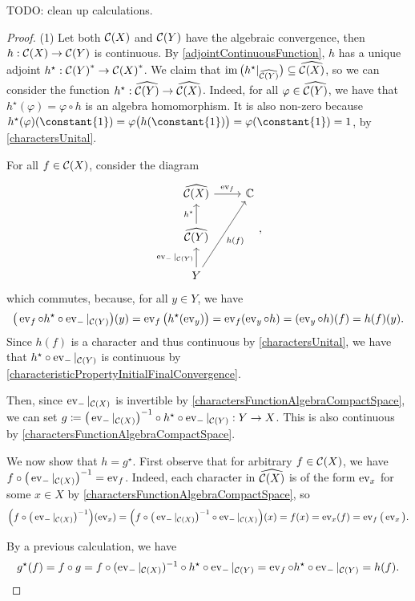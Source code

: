 TODO: clean up calculations.
\begin{proof}
(1) Let both $\operatorname{\mathcal{C}}(X)$ and $\operatorname{\mathcal{C}}(Y)$ have the algebraic convergence, then $h: \operatorname{\mathcal{C}}(X)\to \operatorname{\mathcal{C}}(Y)$ is continuous. By  \ref{adjointContinuousFunction}, $h$ has a unique adjoint $h^\star: {\operatorname{\mathcal{C}}(Y)}^* \to {\operatorname{\mathcal{C}}(X)}^*$. We claim that $\operatorname{im}\big(h^\star|_{\widehat{\operatorname{\mathcal{C}}(Y)}}\big) \subseteq \widehat{\operatorname{\mathcal{C}}(X)}$, so we can consider the function $h^\star: \widehat{\operatorname{\mathcal{C}}(Y)}\to \widehat{\operatorname{\mathcal{C}}(X)}$. Indeed, for all $\varphi\in \widehat{\operatorname{\mathcal{C}}(Y)}$, we have that $h^\star(\varphi) = \varphi \circ h$ is an algebra homomorphism. It is also non-zero because $h^\star(\varphi)(\constant{1}) = \varphi\big(h(\constant{1})\big) = \varphi(\constant{1}) = 1$, by \ref{charactersUnital}.

For all $f\in \operatorname{\mathcal{C}}(X)$, consider the diagram
\[ \begin{tikzcd}
\widehat{\cont(X)} \ar[r, "\evalMap_f"] & \C \\
\widehat{\cont(Y)} \ar[u, "h^\star"] & {} \\
Y \ar[u, "{\evalMap_{-}|_{\cont(Y)}}"] \ar[uur, swap, "h(f)"]
\end{tikzcd}, \]
which commutes, because, for all $y\in Y$, we have
\[ \big(\operatorname{ev}_f \circ h^\star \circ \operatorname{ev}_{-}|_{\operatorname{\mathcal{C}}(Y)}\big)(y) = \operatorname{ev}_f\big(h^\star (\operatorname{ev}_y)\big) = \operatorname{ev}_f(\operatorname{ev}_y \circ h) = (\operatorname{ev}_y\circ h)(f) = h(f)(y). \]
Since $h(f)$ is a character and thus continuous by \ref{charactersUnital}, we have that $h^\star \circ \operatorname{ev}_{-}|_{\operatorname{\mathcal{C}}(Y)}$ is continuous by \ref{characteristicPropertyInitialFinalConvergence}.

Then, since $\operatorname{ev}_{-}|_{\operatorname{\mathcal{C}}(X)}$ is invertible by \ref{charactersFunctionAlgebraCompactSpace}, we can set $g \coloneqq \big(\operatorname{ev}_{-}|_{\operatorname{\mathcal{C}}(X)}\big)^{-1} \circ h^\star \circ \operatorname{ev}_{-}|_{\operatorname{\mathcal{C}}(Y)}: Y\to X$. This is also continuous by \ref{charactersFunctionAlgebraCompactSpace}.

We now show that $h = g^\star$. First observe that for arbitrary $f\in \operatorname{\mathcal{C}}(X)$, we have $f\circ \big(\operatorname{ev}_{-}|_{\operatorname{\mathcal{C}}(X)}\big)^{-1} = \operatorname{ev}_f$. Indeed, each character in $\widehat{\operatorname{\mathcal{C}}(X)}$ is of the form $\operatorname{ev}_x$ for some $x\in X$ by \ref{charactersFunctionAlgebraCompactSpace}, so
\[ \Big(f\circ \big(\operatorname{ev}_{-}|_{\operatorname{\mathcal{C}}(X)}\big)^{-1}\Big)(\operatorname{ev}_x) = \Big(f\circ \big(\operatorname{ev}_{-}|_{\operatorname{\mathcal{C}}(X)}\big)^{-1} \circ \operatorname{ev}_{-}|_{\operatorname{\mathcal{C}}(X)}\Big)(x) = f(x) = \operatorname{ev}_x(f) = \operatorname{ev}_f\big(\operatorname{ev}_x\big). \]

By a previous calculation, we have
\[ g^\star(f) = f\circ g = f\circ (\operatorname{ev}_{-}|_{\operatorname{\mathcal{C}}(X)})^{-1} \circ h^\star \circ \operatorname{ev}_{-}|_{\operatorname{\mathcal{C}}(Y)} = \operatorname{ev}_f \circ h^\star \circ \operatorname{ev}_{-}|_{\operatorname{\mathcal{C}}(Y)} = h(f). \]


\end{proof}
